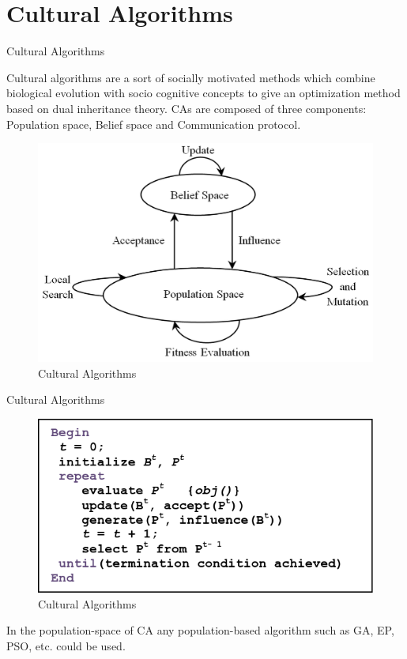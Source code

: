 \documentclass[table]{beamer}
\begin{document}
	\section{Cultural Algorithms}
	
	\begin{frame}{Cultural Algorithms}
		\justifying
		\begin{block}{}
		Cultural algorithms are a sort of socially motivated methods which combine biological evolution with socio cognitive concepts to give an optimization method based on dual inheritance theory. CAs are composed of three components: \alert{Population space}, \alert{Belief space} and \alert{Communication protocol}.
		\end{block}
		\begin{figure}[v]
			\includegraphics[scale=0.09]{CA}
			\centering
			\caption{Cultural Algorithms}
			\label{ref:CA}
		\end{figure}
	\end{frame}
	
	\begin{frame}{Cultural Algorithms}
		\begin{figure}[v]
			\includegraphics[scale=0.45]{capsudocode}
			\centering
			\caption{Cultural Algorithms}
			\label{ref:capsudocode}
		\end{figure}
		\begin{block}{}
			In the \alert{population-space} of CA any population-based algorithm such as GA, EP, PSO, etc. could be used.
		\end{block}
	\end{frame}
	
\end{document}
